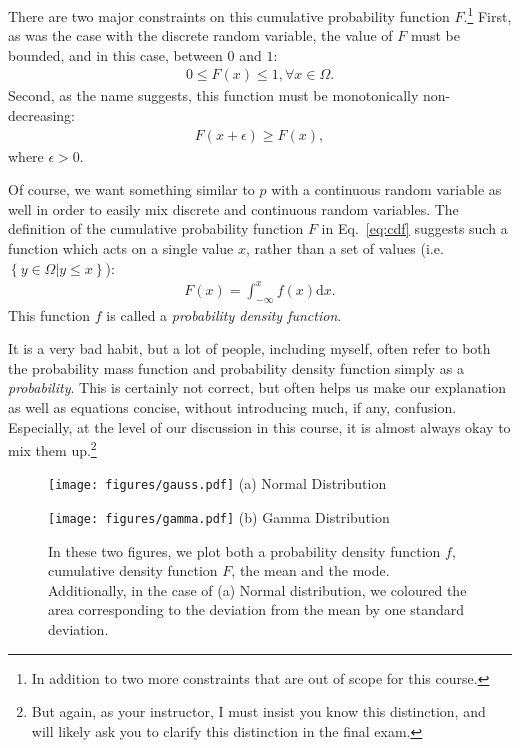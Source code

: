 \documentclass{report}
\newcommand{\dd}[1]{\ensuremath{\mbox{d}#1}}
\begin{document}
There are two major constraints on this cumulative probability function
$F$.\footnote{
    In addition to two more constraints that are out of scope for this course.
} First, as was the case with the discrete random variable, the value of $F$
must be bounded, and in this case, between $0$ and $1$:
\begin{align*}
    0 \leq F(x) \leq 1, \forall x \in \Omega.
\end{align*}
Second, as the name suggests, this function must be monotonically non-decreasing:
\begin{align*}
    F(x+\epsilon) \geq F(x),
\end{align*}
where $\epsilon > 0$.

Of course, we want something similar to $p$ with a continuous random variable as
well in order to easily mix discrete and continuous random variables. The
definition of the cumulative probability function $F$ in Eq.~\eqref{eq:cdf}
suggests such a function which acts on a single value $x$, rather than a set of
values (i.e. $\left\{ y \in \Omega | y \leq x \right\}$): 
\begin{align*}
    F(x) = \int_{-\infty}^x f(x) \dd{x}.
\end{align*}
This function $f$ is called a {\it probability density function}. 

It is a very bad habit, but a lot of people, including myself, often refer to
both the probability mass function and probability density function simply as a
{\it probability}. This is certainly not correct, but often helps us make our
explanation as well as equations concise, without introducing much, if any,
confusion. Especially, at the level of our discussion in this course, it is
almost always okay to mix them up.\footnote{
    But again, as your instructor, I must insist you know this distinction, and
    will likely ask you to clarify this distinction in the final exam.
}

\begin{figure}[t]
    \begin{minipage}{0.48\textwidth}
        \centering
        \texttt{[image: figures/gauss.pdf]}
        (a) Normal Distribution
    \end{minipage}
    \hfill
    \begin{minipage}{0.48\textwidth}
        \centering
        \texttt{[image: figures/gamma.pdf]}
        (b) Gamma Distribution
    \end{minipage}
    \caption{
        \label{fig:distributions}
        In these two figures, we plot both a probability density function $f$,
        cumulative density function $F$, the mean and the mode. Additionally, in
        the case of (a) Normal distribution, we coloured the area corresponding
        to the deviation from the mean by one standard deviation.
    }
\end{figure}
\end{document}
